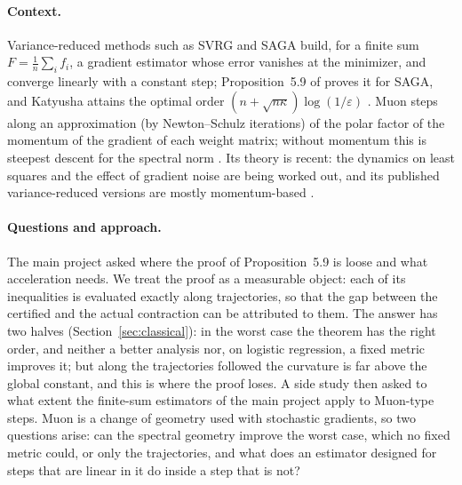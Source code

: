 \documentclass[10pt]{article}
\begin{document}
\paragraph{Context.} Variance-reduced methods such as SVRG \cite{johnson2013accelerating} and SAGA
\cite{defazio2014saga} build, for a finite sum $F=\frac1n\sum_if_i$, a gradient estimator whose error vanishes at the
minimizer, and converge linearly with a constant step; Proposition~5.9 of \cite{bach2024learning} proves it for SAGA,
and Katyusha \cite{allenzhu2018katyusha,kovalev2020dont} attains the optimal order
$(n+\sqrt{n\kappa})\log(1/\varepsilon)$ \cite{lan2018optimal}. Muon \cite{jordan2024muon} steps along an
approximation (by Newton--Schulz iterations) of the polar factor of the momentum of the gradient of each weight matrix; without momentum this is
steepest descent for the spectral norm \cite{carlson2015stochastic,bernstein2024old}. Its theory is recent: the
dynamics on least squares \cite{shulgin2026quadratic,vasudeva2025muon} and the effect of gradient noise
\cite{xie2026muon,chen2026when,paquette2026phases} are being worked out, and its published variance-reduced versions
are mostly momentum-based \cite{liu2025marsm}.

\paragraph{Questions and approach.} The main project asked where the proof of Proposition~5.9 is loose and what
acceleration needs. We treat the proof as a measurable object: each of its inequalities is evaluated exactly along
trajectories, so that the gap between the certified and the actual contraction can be attributed to them. The answer
has two halves (Section~\ref{sec:classical}): in the worst case the theorem has the right order, and neither a better
analysis nor, on logistic regression, a fixed metric improves it; but along the trajectories followed the curvature is far
above the global constant, and this is where the proof loses. A side study then asked to what extent the finite-sum
estimators of the main project apply to Muon-type steps. Muon is a change of geometry used with stochastic gradients, so two questions arise:
can the spectral geometry improve the worst case, which no fixed metric could, or only the trajectories, and what
does an estimator designed for steps that are linear in it do inside a step that is not?
\end{document}
